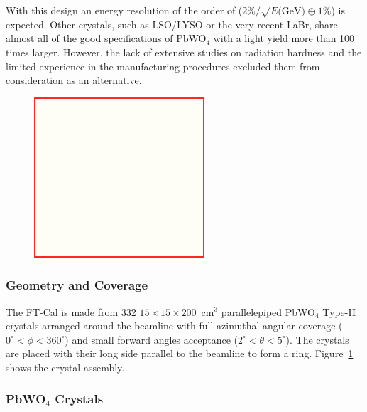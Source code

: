 With this design an energy resolution of the order of ($2\% /\sqrt{E\textrm{(GeV)}} \oplus 1\%$) is expected.
Other crystals, such as LSO/LYSO or the very recent LaBr, share almost all of the good specifications of
PbWO$_4$ with a light yield more than 100 times larger. However, the lack of extensive studies on radiation
hardness and the limited experience in the manufacturing procedures excluded them from consideration as an
alternative.

\begin{figure}[th!]
\centering 
\includegraphics[width=0.85\columnwidth]{fig/dummy.png} 
\caption{} 
\label{fig:ft-cal-geometry} 
\end{figure}

\subsubsection{Geometry and Coverage}

The FT-Cal is made from 332 $15\times 15\times 200$~cm$^3$ parallelepiped PbWO$_4$ Type-II crystals
arranged around the beamline with full azimuthal angular coverage ($0^\circ < \phi < 360^\circ$)  and small
forward angles acceptance ($2^\circ < \theta < 5^\circ$). The crystals are placed with their long side parallel to
the beamline to form a ring. Figure~\ref{fig:ft-cal-geometry} shows the crystal assembly. 

\subsubsection{PbWO$_4$ Crystals}

